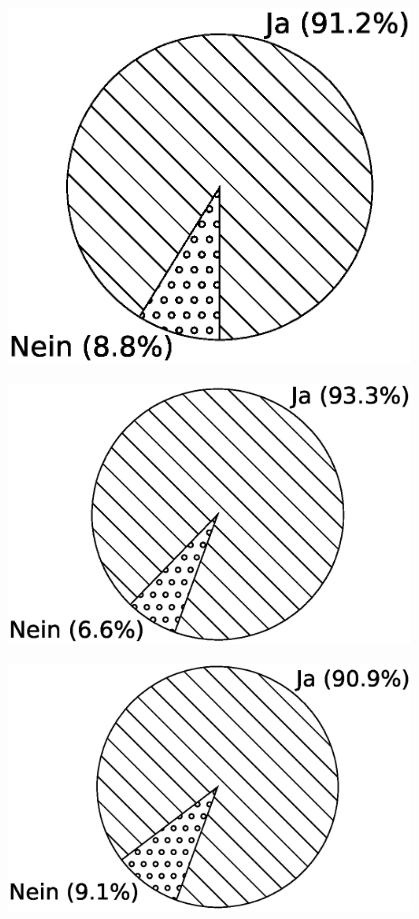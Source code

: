 \begin{minipage}{0.45\textwidth}
  \centering  
  \includegraphics[width=0.8\textwidth]{img/pi_goker_total.eps}
  \label{Chap:Eval-Sec:Goker-Fig:Total}
\end{minipage}
\hfill
\begin{minipage}{0.45\textwidth}
  \centering
  \includegraphics[width=0.8\textwidth]{img/pi_goker_mutex.eps}
  \label{Chap:Eval-Sec:Goker-Fig:Mutex}
\end{minipage}
\begin{minipage}{0.45\textwidth}
  \centering  
  \includegraphics[width=0.8\textwidth]{img/pi_goker_channel.eps}
  \label{Chap:Eval-Sec:Goker-Fig:Channel}
\end{minipage}
